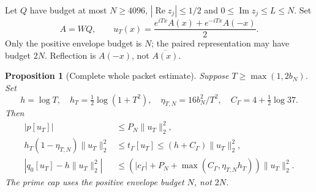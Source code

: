 \documentclass[11pt]{article}
\newtheorem{proposition}[theorem]{Proposition}
\theoremstyle{remark}
\newcommand{\norm}[1]{\lVert #1\rVert}
\newcommand{\Rea}{\operatorname{Re}}
\newcommand{\Ima}{\operatorname{Im}}
\newcommand{\tg}{t_\Gamma}
\newcommand{\cg}{c_\Gamma}
\begin{document}
Let $Q$ have budget at most $N\ge4096$,
$|\Rea z_j|\le1/2$ and $0\le\Ima z_j\le L\le N$. Set
\begin{equation}\label{eq:packet}
 A=WQ,\qquad
 u_T(x)=\frac{e^{iTx}A(x)+e^{-iTx}A(-x)}2.
\end{equation}
Only the positive envelope budget is $N$; the paired representation
may have budget $2N$. Reflection is $A(-x)$, not $\overline{A(x)}$.

\begin{proposition}[Complete whole packet estimate]\label{prop:packet}
Suppose $T\ge\max(1,2b_N)$. Set
\begin{equation}\label{eq:packet-constants}
 h=\log T,\quad h_T=\tfrac12\log(1+T^2),\quad
 \eta_{T,N}=16b_N^2/T^2,\quad C_\Gamma=4+\tfrac12\log37.
\end{equation}
Then
\begin{align}
 |p[u_T]|&\le P_N\norm{u_T}_2^2,\label{eq:packet-prime}\\
 h_T(1-\eta_{T,N})\norm{u_T}_2^2
   &\le\tg[u_T]\le(h+C_\Gamma)\norm{u_T}_2^2,\label{eq:packet-gamma}\\
 |q_0[u_T]-h\norm{u_T}_2^2|
   &\le\left(|\cg|+P_N+
      \max(C_\Gamma,\eta_{T,N}h_T)\right)\norm{u_T}_2^2.
       \label{eq:packet-error}
\end{align}
The prime cap uses the positive envelope budget $N$, not $2N$.
\end{proposition}
\end{document}
